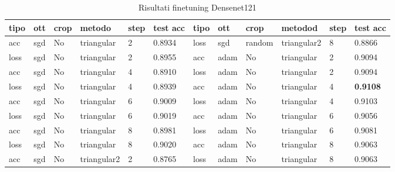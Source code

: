 \begin{table}[H]
\centering
\caption{Risultati finetuning Densenet121}
\begin{adjustbox}{width=1\textwidth}
\begin{tabular}{|l|l|l|l|l|l||l|l|l|l|l|l|}
\hline
\textbf{tipo} & \textbf{ott} & \textbf{crop} & \textbf{metodo} & \textbf{step} & \textbf{test acc} & \textbf{tipo} & \textbf{ott} & \textbf{crop} & \textbf{metodod} & \textbf{step} & \textbf{test acc} \\ \hline
acc           & sgd          & No          & triangular       & 2             & 0.8934            & loss          & sgd          & random        & triangular2      & 8             & 0.8866            \\ \hline
loss          & sgd          & No          & triangular       & 2             & 0.8955            & acc           & adam         & No          & triangular       & 2             & 0.9094            \\ \hline
acc           & sgd          & No          & triangular       & 4             & 0.8910            & loss          & adam         & No          & triangular       & 2             & 0.9094            \\ \hline
loss          & sgd          & No          & triangular       & 4             & 0.8939            & acc           & adam         & No          & triangular       & 4             & \textbf{0.9108}   \\ \hline
acc           & sgd          & No          & triangular       & 6             & 0.9009            & loss          & adam         & No          & triangular       & 4             & 0.9103            \\ \hline
loss          & sgd          & No          & triangular       & 6             & 0.9019            & acc           & adam         & No          & triangular       & 6             & 0.9056            \\ \hline
acc           & sgd          & No          & triangular       & 8             & 0.8981            & loss          & adam         & No          & triangular       & 6             & 0.9081            \\ \hline
loss          & sgd          & No          & triangular       & 8             & 0.9020            & acc           & adam         & No          & triangular       & 8             & 0.9063            \\ \hline
acc           & sgd          & No          & triangular2      & 2             & 0.8765            & loss          & adam         & No          & triangular       & 8             & 0.9063            \\ \hline

\end{tabular}
\end{adjustbox}
\end{table}
